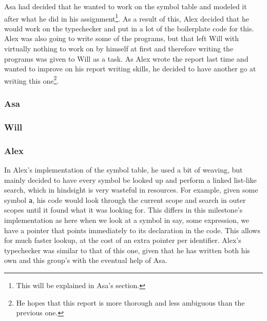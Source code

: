 \documentclass{article}
\begin{document}

 Asa had decided that he wanted to work on the symbol table and modeled it after
 what he did in his assignment\footnote{This will be explained in Asa's section.}.
 As a result of this, Alex decided that he would work on the
 typechecker and put in a lot of the boilerplate code for this. Alex was also
 going to write some of the programs, but that left Will with virtually nothing
 to work on by himself at first and therefore writing the programs was given to
 Will as a task. As Alex wrote the report last time and wanted to improve on his
 report writing skills, he decided to have another go at writing this
 one\footnote{He hopes that this report is more thorough and less ambiguous
 than the previous one.}.

\subsubsection{Asa}


\subsubsection{Will}



\subsubsection{Alex}


In Alex's implementation of the symbol table, he used a bit of weaving, but
mainly decided to have every symbol be looked up and perform a linked list-like
search, which in hindsight is very wasteful in resources. For example,
given some symbol \verb$a$, his code would look through the current scope and
search in outer scopes until it found what it was looking for. This differs
in this milestone's implementation as here when we look at a symbol in say, some
expression, we have a pointer that points immediately to its declaration in
the code. This allows for much faster lookup, at the cost of an extra pointer
per identifier. Alex's typechecker was similar to that of this one, given
that he has written both his own and this group's with the eventual help of
Asa.
\end{document}
